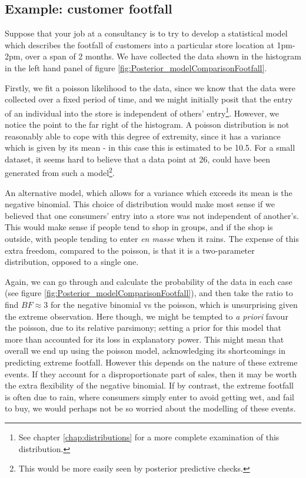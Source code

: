 \documentclass[11pt,fullpage]{book}
\begin{document}
\subsection{Example: customer footfall}
Suppose that your job at a consultancy is to try to develop a statistical model which describes the footfall of customers into a particular store location at 1pm-2pm, over a span of 2 months. We have collected the data shown in the histogram in the left hand panel of figure \ref{fig:Posterior_modelComparisonFootfall}. 

Firstly, we fit a poisson likelihood to the data, since we know that the data were collected over a fixed period of time, and we might initially posit that the entry of an individual into the store is independent of others' entry\footnote{See chapter \ref{chap:distributions} for a more complete examination of this distribution.}. However, we notice the point to the far right of the histogram. A poisson distribution is not reasonably able to cope with this degree of extremity, since it has a variance which is given by its mean - in this case this is estimated to be 10.5. For a small dataset, it seems hard to believe that a data point at 26, could have been generated from such a model\footnote{This would be more easily seen by posterior predictive checks.}.

An alternative model, which allows for a variance which exceeds its mean is the negative binomial. This choice of distribution would make most sense if we believed that one consumers' entry into a store was not independent of another's. This would make sense if people tend to shop in groups, and if the shop is outside, with people tending to enter \textit{en masse} when it rains. The expense of this extra freedom, compared to the poisson, is that it is a two-parameter distribution, opposed to a single one.

Again, we can go through and calculate the probability of the data in each case (see figure \ref{fig:Posterior_modelComparisonFootfall}), and then take the ratio to find $BF\approx 3$ for the negative binomial vs the poisson, which is unsurprising given the extreme observation. Here though, we might be tempted to \textit{a priori} favour the poisson, due to its relative parsimony; setting a prior for this model that more than accounted for its loss in explanatory power. This might mean that overall we end up using the poisson model, acknowledging its shortcomings in predicting extreme footfall. However this depends on the nature of these extreme events. If they account for a disproportionate part of sales, then it may be worth the extra flexibility of the negative binomial. If by contrast, the extreme footfall is often due to rain, where consumers simply enter to avoid getting wet, and fail to buy, we would perhaps not be so worried about the modelling of these events.
\end{document}
